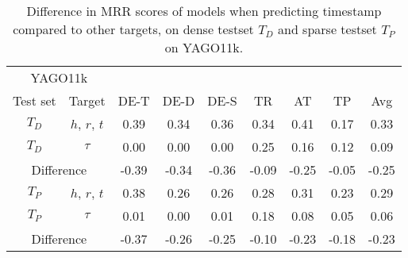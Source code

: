 \begin{table}[htb]
\centering
\begin{minipage}{\columnwidthcaption}
\centering
\caption{Difference in MRR scores of models when predicting timestamp compared to other targets, on dense testset $T_D$ and sparse testset $T_P$ on YAGO11k.}
\label{tab:time_density_timestamp_yago}
\end{minipage}
\vspace{-3mm}

\begin{tabular}{cc|cccccc|c} \hline
\multicolumn{2}{c|}{YAGO11k} & & & & & & \\
Test set & Target & DE-T & DE-D & DE-S & TR & AT & TP & Avg \\ \hline 
$T_D$ & $h$, $r$, $t$ & 
0.39 & 0.34 & 0.36 & 0.34 & 0.41 & 0.17 & 0.33 \\
$T_D$ & $\tau$        & 
0.00 & 0.00 & 0.00 & 0.25 & 0.16 & 0.12 & 0.09 \\ \hline
\multicolumn{2}{c|}{Difference} & 
-0.39 & -0.34 & -0.36 & -0.09 & -0.25 & -0.05 & -0.25 \\ \hline\hline
$T_P$ & $h$, $r$, $t$ & 
0.38 & 0.26 & 0.26 & 0.28 & 0.31 & 0.23 & 0.29 \\
$T_P$ & $\tau$        & 
0.01 & 0.00 & 0.01 & 0.18 & 0.08 & 0.05 & 0.06 \\ \hline 
\multicolumn{2}{c|}{Difference} & 
-0.37 & -0.26 & -0.25 & -0.10 & -0.23 & -0.18 & -0.23 \\ \hline
\end{tabular}

\end{table}

